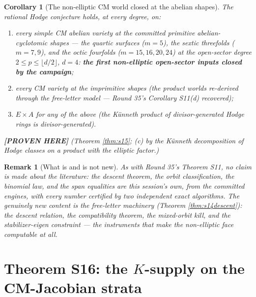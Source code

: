 \documentclass[11pt]{article}
\newtheorem{corollary}[theorem]{Corollary}
\newtheorem{remark}[theorem]{Remark}
\newcommand{\PROVEN}{\textbf{[PROVEN HERE]}}
\begin{document}
\begin{corollary}[The non-elliptic CM world closed at the abelian
shapes]\label{cor:s15}
The rational Hodge conjecture holds, at every degree, on:
\begin{enumerate}[label=(\alph*)]
\item every \emph{simple} CM abelian variety at the committed primitive
abelian-cyclotomic shapes --- the quartic surfaces ($m=5$), the sextic
threefolds ($m=7,9$), and the octic fourfolds ($m=15,16,20,24$) at the
open-sector degree $2\le p\le\lfloor d/2\rfloor$, $d=4$: \textbf{the first
non-elliptic open-sector inputs closed by the campaign};
\item every CM variety at the imprimitive shapes (the product worlds
re-derived through the free-letter model --- Round 35's Corollary S11(d)
recovered);
\item $E\times A$ for any of the above (the K\"unneth product of
divisor-generated Hodge rings is divisor-generated).
\end{enumerate}
\PROVEN{} (Theorem \ref{thm:s15}; (c) by the K\"unneth decomposition of Hodge
classes on a product with the elliptic factor.)
\end{corollary}

\begin{remark}[What is and is not new]
As with Round 35's Theorem S11, no claim is made about the literature: the
descent theorem, the orbit classification, the binomial law, and the span
equalities are this session's own, from the committed engines, with every
number certified by two independent exact algorithms. The genuinely new content
is the \emph{free-letter} machinery (Theorem \ref{thm:s14descent}): the descent
relation, the compatibility theorem, the mixed-orbit kill, and the
stabilizer-eigen constraint --- the instruments that make the non-elliptic face
computable at all.
\end{remark}

\section{Theorem S16: the \texorpdfstring{$K$}{K}-supply on the CM-Jacobian strata}
\end{document}
